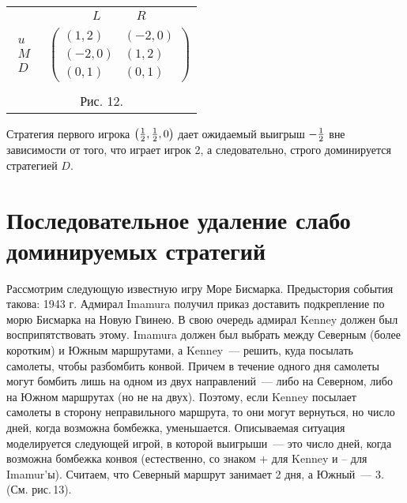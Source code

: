 \documentclass[12pt]{article}
\begin{document}
\begin{center}
\begin{tabular}{cc}
&$\begin{array}{cc} L\quad &\quad R \end{array}$\\
$\begin{array}{c} u\\ M\\ D\end{array}$& $\left(\begin{array}{cc}
(1,2)&(-2,0)\\
(-2,0)&(1,2)\\
(0,1)&(0,1) \end{array}\right)$\\
\multicolumn{2}{c}{}\\
\multicolumn{2}{c}{Рис. 12.}\\
\end{tabular}
\end{center}

Стратегия первого игрока $\left({1\over 2}, {1\over 2},0\right)$
дает ожидаемый выигрыш $-{1\over 2}$ вне зависимости от того, что
играет игрок 2, а следовательно, строго доминируется стратегией $D$.


\section {Последовательное удаление слабо доминируемых стратегий}

Рассмотрим следующую известную игру Море Бисмарка. Предыстория
события такова:  1943 г. Адмирал Imamura получил приказ доставить
подкрепление по морю Бисмарка на Новую Гвинею.  В свою очередь
адмирал Kenney должен был восприпятствовать этому. Imamura должен
был выбрать между Северным (более коротким) и Южным маршрутами, а
Kenney~--- решить, куда посылать самолеты, чтобы разбомбить
конвой. Причем в течение одного дня самолеты могут бомбить лишь на
одном из двух направлений~--- либо на Северном, либо на Южном
маршрутах (но не на двух). Поэтому, если Kenney посылает самолеты
в сторону неправильного маршрута, то они могут вернуться, но число
дней, когда возможна бомбежка, уменьшается. Описываемая ситуация
моделируется следующей игрой, в которой выигрыши~--- это число
дней, когда возможна бомбежка конвоя (естественно, со знаком + для
Kenney и -- для Imamur'ы).  Считаем, что Северный маршрут занимает
2 дня, а Южный~--- 3. (См. рис.\,13).
\end{document}
